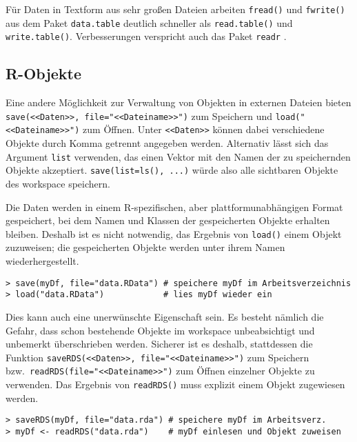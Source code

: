 Für Daten in Textform aus sehr großen Dateien arbeiten \lstinline!fread()! und \lstinline!fwrite()! aus dem Paket \lstinline!data.table! \cite{Dowle2014} deutlich schneller als \lstinline!read.table()! und \lstinline!write.table()!. Verbesserungen verspricht auch das Paket \lstinline!readr! \cite{Wickham2015c}.

\subsection{R-Objekte}
\label{sec:saveRDS}

Eine andere Möglichkeit zur Verwaltung von Objekten in externen Dateien bieten \lstinline!save(<<Daten>>, file="<<Dateiname>>")! zum Speichern und \lstinline!load("<<Dateiname>>")! zum Öffnen. Unter \lstinline!<<Daten>>! können dabei verschiedene Objekte durch Komma getrennt angegeben werden. Alternativ lässt sich das Argument \lstinline!list! verwenden, das einen Vektor mit den Namen der zu speichernden Objekte akzeptiert. \lstinline!save(list=ls(), ...)! würde also alle sichtbaren Objekte des workspace speichern.

Die Daten werden in einem R-spezifischen, aber plattformunabhängigen Format gespeichert, bei dem Namen und Klassen der gespeicherten Objekte erhalten bleiben. Deshalb ist es nicht notwendig, das Ergebnis von \lstinline!load()! einem Objekt zuzuweisen; die gespeicherten Objekte werden unter ihrem Namen wiederhergestellt.
\begin{lstlisting}
> save(myDf, file="data.RData") # speichere myDf im Arbeitsverzeichnis
> load("data.RData")            # lies myDf wieder ein
\end{lstlisting}
  
Dies kann auch eine unerwünschte Eigenschaft sein. Es besteht nämlich die Gefahr, dass schon bestehende Objekte im workspace unbeabsichtigt und unbemerkt überschrieben werden. Sicherer ist es deshalb, stattdessen die Funktion \lstinline!saveRDS(<<Daten>>, file="<<Dateiname>>")! zum Speichern bzw.\ \lstinline!readRDS(file="<<Dateiname>>")! zum Öffnen einzelner Objekte zu verwenden. Das Ergebnis von \lstinline!readRDS()! muss explizit einem Objekt zugewiesen werden.
\begin{lstlisting}
> saveRDS(myDf, file="data.rda") # speichere myDf im Arbeitsverz.
> myDf <- readRDS("data.rda")    # myDf einlesen und Objekt zuweisen
\end{lstlisting}


